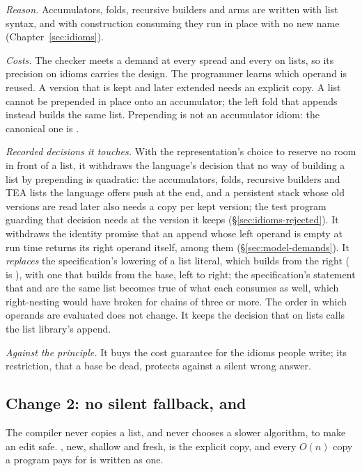 \emph{Reason.} Accumulators, folds, recursive builders and  arms are written with list syntax,
and with construction consuming they run in place with no new name (Chapter~\ref{sec:idioms}).

\emph{Costs.} The checker meets a demand at every spread and every \code{++} on lists, so its precision
on idioms carries the design. The programmer learns which operand is reused. A version that is kept and
later extended needs an explicit copy. A list cannot be prepended in place onto an accumulator; the left
fold that appends instead builds the same list. Prepending is not an accumulator idiom: the canonical one is
\code{[ …acc, x ]}.

\emph{Recorded decisions it touches.} With the representation's choice to reserve no room in front of a
list, it withdraws the language's decision that no way of building a list by prepending is quadratic:
the accumulators, folds, recursive builders and TEA lists the language offers push at the end, and a
persistent stack whose old versions are read later also needs a copy per kept version; the test
program guarding that decision needs  at the version it keeps
(\S\ref{sec:idioms-rejected}). It withdraws the identity promise that an append whose left operand is empty
at run time returns its right operand itself,  among them (\S\ref{sec:model-demands}). It
\emph{replaces} the specification's lowering of a list literal, which builds from the right
(\code{[ …a, …b, …c ]} is ), with one that builds from the base,
left to right; the specification's statement that \code{[ …xs, …ys ]} and  are the same list
becomes true of what each consumes as well, which right-nesting would have broken for chains of three or
more. The order in which operands are evaluated does not change. It keeps the decision that \code{++} on
lists calls the list library's append.

\emph{Against the principle.} It buys the cost guarantee for the idioms people write; its restriction,
that a base be dead, protects against a silent wrong answer.

\subsection*{Change 2: no silent fallback, and }

The compiler never copies a list, and never chooses a slower algorithm, to make an edit safe.
, new, shallow and fresh, is the explicit copy, and every $O(n)$ copy a
program pays for is written as one.


